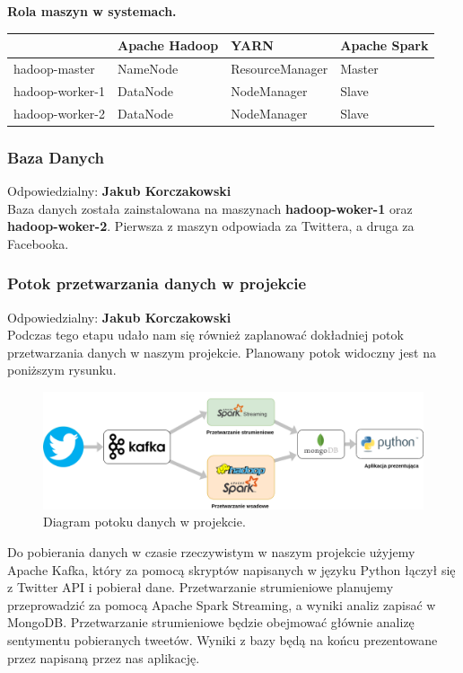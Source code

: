 \documentclass[a4paper,11pt, notitlepage ]{article}
\begin{document}
    \textbf{Rola maszyn w systemach.}

    \begin{tabular}{|l|l|l|l|} \hline
        & Apache Hadoop & YARN & Apache Spark \\ \hline \hline
        hadoop-master & NameNode & ResourceManager & Master\\ \hline
        hadoop-worker-1 & DataNode & NodeManager & Slave\\ \hline
        hadoop-worker-2 & DataNode & NodeManager & Slave\\ \hline
    \end{tabular}

    \subsubsection{Baza Danych} 
    Odpowiedzialny: \textbf{Jakub Korczakowski} \\
    Baza danych została zainstalowana na maszynach \textbf{hadoop-woker-1} oraz \textbf{hadoop-woker-2}. Pierwsza z maszyn odpowiada za Twittera, a druga za Facebooka.

    \subsubsection{Potok przetwarzania danych w projekcie} 
    Odpowiedzialny: \textbf{Jakub Korczakowski} \\
    Podczas tego etapu udało nam się również zaplanować dokładniej potok przetwarzania danych w naszym projekcie. Planowany potok widoczny jest na poniższym rysunku.

    \begin{figure}[h]
        \centering
        \includegraphics[width=1 \textwidth]{FlowChart.png}
        \caption{Diagram potoku danych w projekcie.}
        \label{fig:diagram}
    \end{figure}

    Do pobierania danych w czasie rzeczywistym w naszym projekcie użyjemy Apache Kafka, który za pomocą skryptów napisanych w języku Python łączył się z Twitter API i pobierał dane. Przetwarzanie strumieniowe planujemy przeprowadzić za pomocą Apache Spark Streaming, a wyniki analiz zapisać w MongoDB. Przetwarzanie strumieniowe będzie obejmować głównie analizę sentymentu pobieranych tweetów. Wyniki z bazy będą na końcu prezentowane przez napisaną przez nas aplikację.
\end{document}
